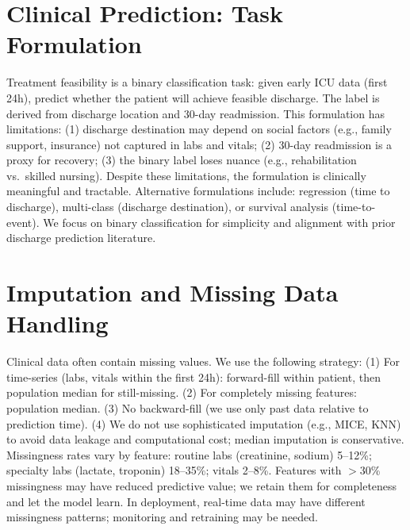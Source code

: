 \section{Clinical Prediction: Task Formulation}

Treatment feasibility is a binary classification task: given early ICU data (first 24h), predict whether the patient will achieve feasible discharge. The label is derived from discharge location and 30-day readmission. This formulation has limitations: (1) discharge destination may depend on social factors (e.g., family support, insurance) not captured in labs and vitals; (2) 30-day readmission is a proxy for recovery; (3) the binary label loses nuance (e.g., rehabilitation vs.\ skilled nursing). Despite these limitations, the formulation is clinically meaningful and tractable. Alternative formulations include: regression (time to discharge), multi-class (discharge destination), or survival analysis (time-to-event). We focus on binary classification for simplicity and alignment with prior discharge prediction literature.

\section{Imputation and Missing Data Handling}

Clinical data often contain missing values. We use the following strategy: (1) For time-series (labs, vitals within the first 24h): forward-fill within patient, then population median for still-missing. (2) For completely missing features: population median. (3) No backward-fill (we use only past data relative to prediction time). (4) We do not use sophisticated imputation (e.g., MICE, KNN) to avoid data leakage and computational cost; median imputation is conservative. Missingness rates vary by feature: routine labs (creatinine, sodium) 5--12\%; specialty labs (lactate, troponin) 18--35\%; vitals 2--8\%. Features with $>$30\% missingness may have reduced predictive value; we retain them for completeness and let the model learn. In deployment, real-time data may have different missingness patterns; monitoring and retraining may be needed.

